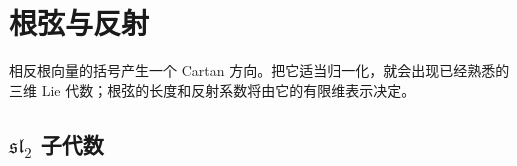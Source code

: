 
\section{根弦与反射}
\label{b5:sec:1603}

相反根向量的括号产生一个 Cartan 方向。把它适当归一化，就会出现已经熟悉的三维 Lie 代数；根弦的长度和反射系数将由它的有限维表示决定。


%
%

\subsection{\texorpdfstring{\(\mathfrak{sl}_2\) 子代数}{sl2 子代数}}
\label{b5:subsec:1603:01}

